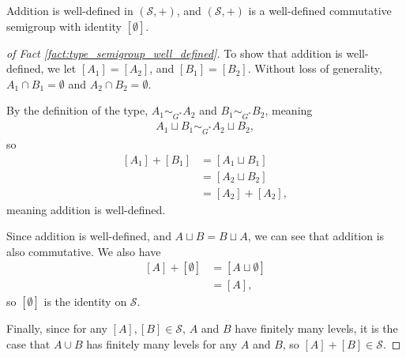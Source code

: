 \begin{fact}\label{fact:type_semigroup_well_defined}
  Addition is well-defined in $\left(\mathcal{S},+\right)$, and $\left(\mathcal{S},+\right)$ is a well-defined commutative semigroup with identity $\left[\emptyset\right]$.
\end{fact}
\begin{proof}[of Fact \ref{fact:type_semigroup_well_defined}]
  To show that addition is well-defined, we let $\left[A_1\right] = \left[A_2\right]$, and $\left[B_1\right] = \left[B_2\right]$. Without loss of generality, $A_1\cap B_1 = \emptyset$ and $A_2\cap B_2 = \emptyset$.\newline

  By the definition of the type, $A_1\sim_{G^{\ast}}A_2$ and $B_1\sim_{G^{\ast}}B_2$, meaning
  \begin{align*}
    A_1\sqcup B_1\sim_{G^{\ast}} A_2\sqcup B_2,
  \end{align*}
  so
  \begin{align*}
    \left[A_1\right] + \left[B_1\right] &= \left[A_1\sqcup B_1\right]\\
                                        &= \left[A_2\sqcup B_2\right]\\
                                        &= \left[A_2\right] + \left[A_2\right],
  \end{align*}
  meaning addition is well-defined.\newline

  Since addition is well-defined, and $A\sqcup B = B\sqcup A$, we can see that addition is also commutative. We also have
  \begin{align*}
    \left[A\right] + \left[\emptyset\right] &= \left[A\sqcup \emptyset\right]\\
                                            &= \left[A\right],
  \end{align*}
  so $\left[\emptyset\right]$ is the identity on $\mathcal{S}$.\newline

  Finally, since for any $\left[A\right],\left[B\right]\in \mathcal{S}$, $A$ and $B$ have finitely many levels, it is the case that $A\cup B$ has finitely many levels for any $A$ and $B$, so $\left[A\right] + \left[B\right] \in \mathcal{S}$. 
\end{proof}

